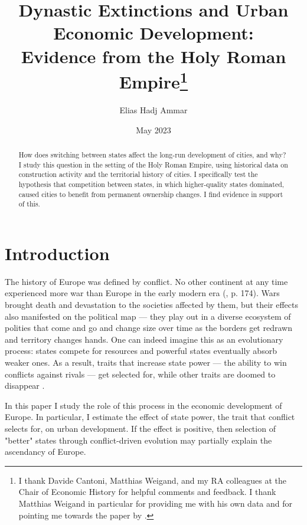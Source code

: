 \documentclass{article}
\title{Dynastic Extinctions and Urban Economic Development: \\Evidence from the Holy Roman Empire\footnote{
I thank Davide Cantoni, Matthias Weigand, and my RA colleagues at the Chair of Economic History for helpful comments and feedback. I thank Matthias Weigand in particular for providing me with his own data and for pointing me towards the paper by \cite{schoenholzer2022}.
}
}
\author{Elias Hadj Ammar}
\date{May 2023}
\begin{document}
\onehalfspacing
\maketitle
\thispagestyle{empty}

\begin{abstract}
How does switching between states affect the long-run development of cities, and why? I study this question in the setting of the Holy Roman Empire, using historical data on construction activity and the territorial history of cities. I specifically test the hypothesis that competition between states, in which higher-quality states dominated, caused cities to benefit from permanent ownership changes. I find evidence in support of this.
\end{abstract}

\newpage

\setcounter{page}{1}
\doublespacing



\section{Introduction}



The history of Europe was defined by conflict. No other continent at any time experienced more war than Europe in the early modern era (\citealp{voigtlnder2013}, p. 174). Wars brought death and devastation to the societies affected by them, but their effects also manifested on the political map --- they play out in a diverse ecosystem of polities that come and go and change size over time as the borders get redrawn and territory changes hands. One can indeed imagine this as an evolutionary process: states compete for resources and powerful states eventually absorb weaker ones. As a result, traits that increase state power --- the ability to win conflicts against rivals --- get selected for, while other traits are doomed to disappear \citep{levine2013, levine2021}.

In this paper I study the role of this process in the economic development of Europe. In particular, I estimate the effect of state power, the trait that conflict selects for, on urban development. If the effect is positive, then selection of "better" states through conflict-driven evolution may partially explain the ascendancy of Europe.
\end{document}
